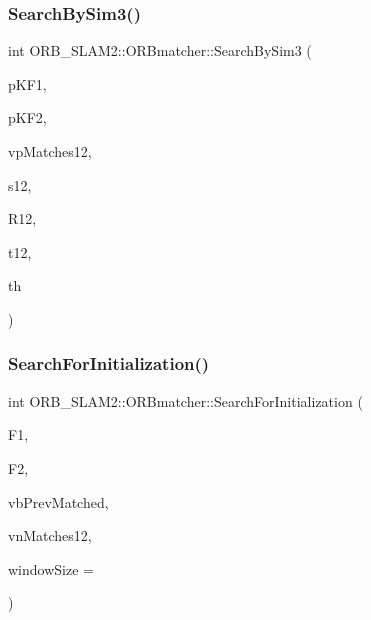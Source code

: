 \mbox{\label{class_o_r_b___s_l_a_m2_1_1_o_r_bmatcher_a9b9c641423a8075aa2a6f1d5bab4d211}} 
\subsubsection{\texorpdfstring{Search\+By\+Sim3()}{SearchBySim3()}}
{\footnotesize\ttfamily int O\+R\+B\+\_\+\+S\+L\+A\+M2\+::\+O\+R\+Bmatcher\+::\+Search\+By\+Sim3 (\begin{DoxyParamCaption}\item[{\mbox{\hyperlink{class_o_r_b___s_l_a_m2_1_1_key_frame}{Key\+Frame}} $\ast$}]{p\+K\+F1,  }\item[{\mbox{\hyperlink{class_o_r_b___s_l_a_m2_1_1_key_frame}{Key\+Frame}} $\ast$}]{p\+K\+F2,  }\item[{std\+::vector$<$ \mbox{\hyperlink{class_o_r_b___s_l_a_m2_1_1_map_point}{Map\+Point}} $\ast$$>$ \&}]{vp\+Matches12,  }\item[{const float \&}]{s12,  }\item[{const cv\+::\+Mat \&}]{R12,  }\item[{const cv\+::\+Mat \&}]{t12,  }\item[{const float}]{th }\end{DoxyParamCaption})}

\mbox{\label{class_o_r_b___s_l_a_m2_1_1_o_r_bmatcher_aff9b6dde7878d59e334ed5ad2ddd04eb}} 
\subsubsection{\texorpdfstring{Search\+For\+Initialization()}{SearchForInitialization()}}
{\footnotesize\ttfamily int O\+R\+B\+\_\+\+S\+L\+A\+M2\+::\+O\+R\+Bmatcher\+::\+Search\+For\+Initialization (\begin{DoxyParamCaption}\item[{\mbox{\hyperlink{class_o_r_b___s_l_a_m2_1_1_frame}{Frame}} \&}]{F1,  }\item[{\mbox{\hyperlink{class_o_r_b___s_l_a_m2_1_1_frame}{Frame}} \&}]{F2,  }\item[{std\+::vector$<$ cv\+::\+Point2f $>$ \&}]{vb\+Prev\+Matched,  }\item[{std\+::vector$<$ int $>$ \&}]{vn\+Matches12,  }\item[{int}]{window\+Size = {} }\end{DoxyParamCaption})}

